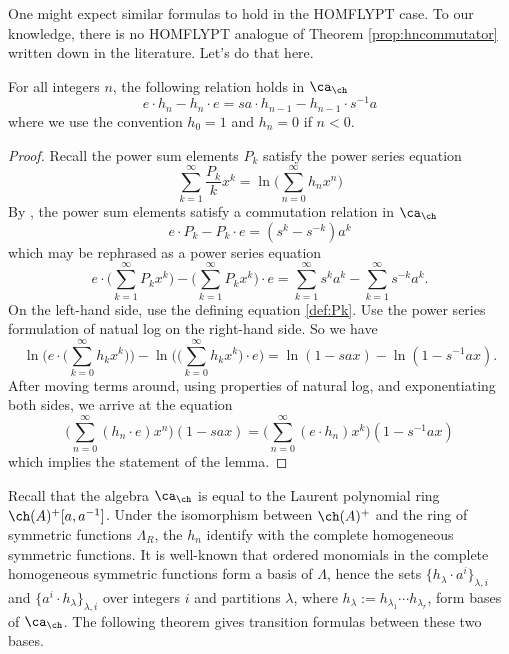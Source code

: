 One might expect similar formulas to hold in the HOMFLYPT case. To our knowledge, there is no HOMFLYPT analogue of Theorem \ref{prop:hncommutator} written down in the literature. Let's do that here. 

\begin{lemma} \label{lem:homfly1}
For all integers $n$, the following relation holds in $\ca_\ch$
\begin{equation}
e \cdot h_n - h_n \cdot e = s a \cdot h_{n-1} - h_{n-1} \cdot  s^{-1} a
\end{equation}
where we use the convention $h_0 = 1$ and $h_n = 0$ if $n < 0$. 
\end{lemma}
\begin{proof}
Recall the power sum elements $P_k$ satisfy the power series equation
\begin{equation} \label{def:Pk}
\sum_{k=1}^\infty \frac{P_k}{k} x^k = \ln \Big( \sum_{n=0}^\infty h_n x^n \Big)
\end{equation}
By \cite[Theorem 4.2]{Mor02b}, the power sum elements satisfy a commutation relation in $\ca_\ch$
\begin{equation}
e \cdot P_k - P_k \cdot e = (s^{k} - s^{-k}) a^k
\end{equation} 
which may be rephrased as a power series equation 
\[
e \cdot \Big( \sum_{k=1}^\infty P_k x^k \Big) - \Big( \sum_{k=1}^\infty P_k x^k \Big) \cdot e = \sum_{k=1}^\infty s^k a^k - \sum_{k=1}^\infty s^{-k} a^k.
\]
On the left-hand side, use the defining equation \eqref{def:Pk}. Use the power series formulation of natual log on the right-hand side. So we have
\[
\ln \Bigg( e \cdot \Big( \sum_{k=0}^\infty h_k x^k \Big) \Bigg) - \ln \Bigg( \Big( \sum_{k=0}^\infty h_k x^k \Big) \cdot e \Bigg) = \ln ( 1 - s a x ) - \ln ( 1 - s^{-1} a x ).
\]
After moving terms around, using properties of natural log, and exponentiating both sides, we arrive at the equation
\[
\Big( \sum_{n=0}^\infty (h_n \cdot e ) x^n \Big) ( 1 - s a x ) = \Big( \sum_{n=0}^\infty ( e \cdot h_n ) x^k \Big) ( 1 - s^{-1} a x )
\]
which implies the statement of the lemma.
\end{proof}

Recall that the algebra $\ca_\ch$ is equal to the Laurent polynomial ring $\ch(A)^+[a, a^{-1}]$. Under the isomorphism between $\ch(A)^+$ and the ring of symmetric functions $\Lambda_R$, the $h_n$ identify with the complete homogeneous symmetric functions. It is well-known that ordered monomials in the complete homogeneous symmetric functions form a basis of $\Lambda$, hence the sets $\{h_\lambda \cdot a^i \}_{\lambda, i}$ and $\{a^i \cdot h_\lambda \}_{\lambda, i}$ over integers $i$ and partitions $\lambda$, where $h_\lambda := h_{\lambda_1} \cdots h_{\lambda_r}$, form bases of $\ca_\ch$. The following theorem gives transition formulas between these two bases. 

